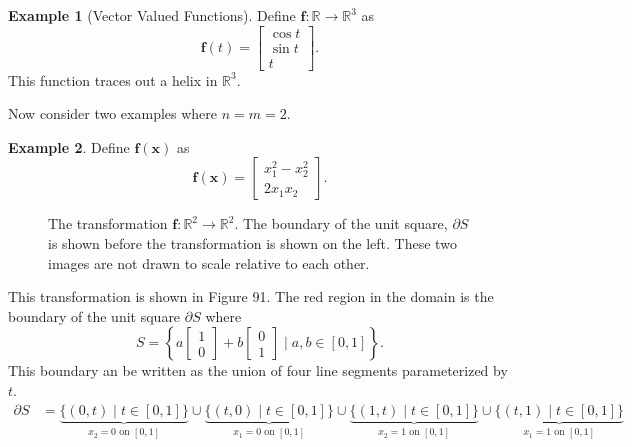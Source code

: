 \documentclass{article}
\newcommand{\R}{\mathbb{R}}
\newcommand{\x}{\mathbf{x}}
\newcommand{\f}{\mathbf{f}}
\theoremstyle{definition}
\newtheorem{example}{Example}[section]
\begin{document}
	\begin{example}[Vector Valued Functions]
		Define $ \f:\R\to\R^3 $ as $$ \f(t)=\begin{bmatrix}
			\cos t\\ \sin t\\ t
		\end{bmatrix}  .$$  This function traces out a helix in $ \R^3 $. 
	\end{example}
	
	Now consider two examples where $ n=m=2 $. 
	\begin{example}
		Define $ \f(\x) $ as $$ \f(\x)=\begin{bmatrix}
			x_1^2-x_2^2\\
			2x_1x_2
		\end{bmatrix}. $$
		\begin{figure}[h!]
			\centering
			\caption{The transformation $ \f:\R^2\to\R^2 $. The boundary of the unit square, $ \partial S $ is shown before the transformation is shown on the left. These two images are not drawn to scale relative to each other. }
		\end{figure}	
		This transformation is shown in Figure 91. The red region in the domain is the boundary of the unit square $ \partial S $ where $$ S=\left\{a\begin{bmatrix}
			1\\0
		\end{bmatrix} + b\begin{bmatrix}
			0\\1
		\end{bmatrix}\mid a,b\in[0,1]\right\}.$$
		This boundary an be written as the union of four line segments parameterized by $ t $. 
		\begin{align*}
			\partial S & = \underbrace{\{(0,t) \mid t \in [0,1]\}}_{x_2=0\text{ on }[0,1]} \cup\underbrace{ \{(t,0) \mid t \in [0,1]\} }_{x_1=0\text{ on }[0,1]}\cup\underbrace{ \{(1,t) \mid t \in [0,1]\} }_{x_2=1\text{ on }[0,1]} \cup\underbrace{ \{(t,1) \mid t \in [0,1]\} }_{x_1=1\text{ on }[0,1]}

\end{align*}
\end{example}
\end{document}
